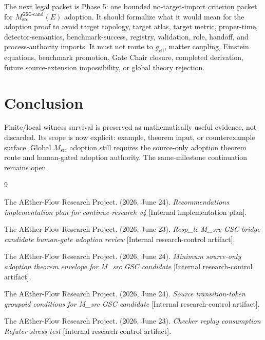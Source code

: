 \documentclass[11pt]{article}
\newcommand{\GSC}{\mathsf{GSC}}
\newcommand{\Msrc}{M_{\mathrm{src}}}
\newcommand{\Mgsccand}{M_{\mathrm{src}}^{\GSC\mbox{-}\mathrm{cand}}}
\newcommand{\geff}{g_{\mathrm{eff}}}
\begin{document}
The next legal packet is Phase 5: one bounded no-target-import criterion
packet for \(\Mgsccand(E)\) adoption. It should formalize what it would mean
for the adoption proof to avoid target topology, target atlas, target metric,
proper-time, detector-semantics, benchmark-success, registry, validation,
role, handoff, and process-authority imports. It must not route to \(\geff\),
matter coupling, Einstein equations, benchmark promotion, Gate Chair closure,
completed derivation, future source-extension impossibility, or global theory
rejection.

\section{Conclusion}

Finite/local witness survival is preserved as mathematically useful evidence,
not discarded. Its scope is now explicit: example, theorem input, or
counterexample surface. Global \(\Msrc\) adoption still requires the
source-only adoption theorem route and human-gated adoption authority. The
same-milestone continuation remains open.

\begin{thebibliography}{9}

The AEther-Flow Research Project. (2026, June 24). \emph{Recommendations
implementation plan for continue-research v4} [Internal implementation plan].

The AEther-Flow Research Project. (2026, June 23). \emph{Resp\_lc M\_src GSC
bridge candidate human-gate adoption review} [Internal research-control
artifact].

The AEther-Flow Research Project. (2026, June 24). \emph{Minimum source-only
adoption theorem envelope for M\_src GSC candidate} [Internal research-control
artifact].

The AEther-Flow Research Project. (2026, June 24). \emph{Source transition-token
groupoid conditions for M\_src GSC candidate} [Internal research-control
artifact].

The AEther-Flow Research Project. (2026, June 23). \emph{Checker replay
consumption Refuter stress test} [Internal research-control artifact].

\end{thebibliography}
\end{document}
